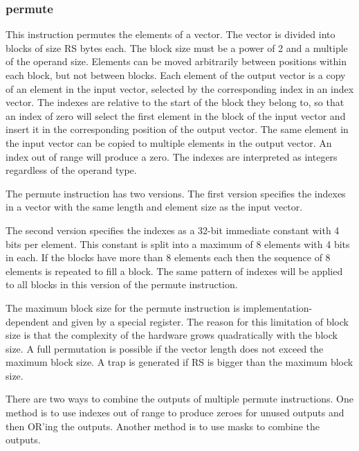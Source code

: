 \documentclass[forwardcom.tex]{subfiles}
\begin{document}
\subsubsection{permute}
This instruction permutes the elements of a vector. The vector is divided into blocks of size RS bytes each. The block size must be a power of 2 and a multiple of the operand size. Elements can be moved arbitrarily between positions within each block, but not between blocks. Each element of the output vector is a copy of an element in the input vector, selected by the corresponding index in an index vector. The indexes are relative to the start of the block they belong to, so that an index of zero will select the first element in the block of the input vector and insert it in the corresponding position of the output vector. The same element in the input vector can be copied to multiple elements in the output vector. An index out of range will produce a zero. The indexes are interpreted as  integers regardless of the operand type.
\vspace{2mm}

The permute instruction has two versions. The first version specifies the indexes in a vector with the same length and element size as the input vector.
\vspace{2mm}

The second version specifies the indexes as a 32-bit immediate constant with 4 bits per element. This constant is split into a maximum of 8 elements with 4 bits in each. If the blocks have more than 8 elements each then the sequence of 8 elements is repeated to fill a block. The same pattern of indexes will be applied to all blocks in this version of the permute instruction.
\vspace{2mm}

The maximum block size for the permute instruction is implementation-dependent and given by a special register. The reason for this limitation of block size is that the complexity of the hardware grows quadratically with the block size. A full permutation is possible if the vector length does not exceed the maximum block size. A trap is generated if RS is bigger than the maximum block size.
\vspace{2mm}

There are two ways to combine the outputs of multiple permute instructions. One method is to use indexes out of range to produce zeroes for unused outputs and then OR'ing the outputs. Another method is to use masks to combine the outputs.
\vspace{2mm}
\end{document}
